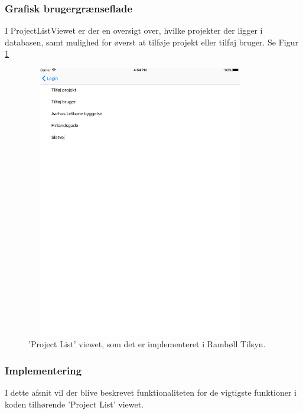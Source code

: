 \subsubsection{Grafisk brugergrænseflade}
I ProjectListViewet er der en oversigt over, hvilke projekter der ligger i databasen, samt mulighed for øverst at tilføje projekt eller tilføj bruger. Se Figur \ref{fig:ProjectListView}
\begin{figure}[H] %
	\centering
	\includegraphics[height=12cm, width=10cm]{../ArkitekturDesign/Design/ProjectList/ProjectList}
	\caption{'Project List' viewet, som det er implementeret i Rambøll Tilsyn.}
	\label{fig:ProjectListView}
\end{figure}

\clearpage

\subsubsection{Implementering}
I dette afsnit vil der blive beskrevet funktionaliteten for de vigtigste funktioner i koden tilhørende 'Project List' viewet.

